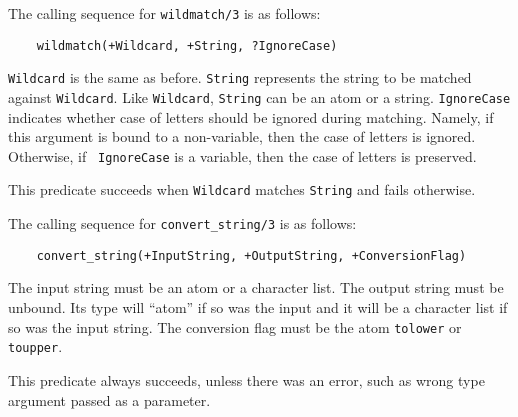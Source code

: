 The calling sequence for {\tt wildmatch/3}  is as follows:
\begin{verbatim}
    wildmatch(+Wildcard, +String, ?IgnoreCase)  
\end{verbatim}
{\tt Wildcard} is the same as before. {\tt String} represents the string to
be matched against {\tt Wildcard}. Like {\tt Wildcard}, {\tt String} can be
an atom or a string. {\tt IgnoreCase} indicates whether case of letters
should be ignored during matching. Namely, if this argument is bound to a
non-variable, then the case of letters is ignored. Otherwise, if {\tt
  IgnoreCase} is a variable, then the case of letters is preserved.

This predicate succeeds when {\tt Wildcard} matches {\tt String} and fails
otherwise.

The calling sequence for {\tt convert\_string/3}  is as follows:
\begin{verbatim}
    convert_string(+InputString, +OutputString, +ConversionFlag)  
\end{verbatim}
The input string must be an atom or a character list. The output string
must be unbound. Its type will ``atom'' if so was the input and it will be
a character list if so was the input string. The conversion flag must be
the atom {\tt tolower} or {\tt toupper}. 

This predicate always succeeds, unless there was an error, such as wrong
type argument passed as a parameter.





